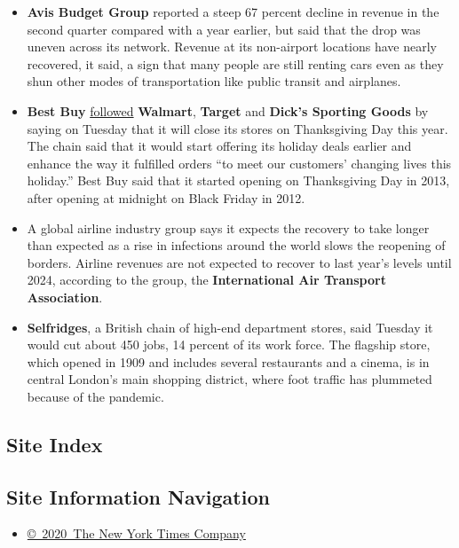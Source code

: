 \begin{itemize}
\item
  \textbf{Avis Budget Group} reported a steep 67 percent decline in
  revenue in the second quarter compared with a year earlier, but said
  that the drop was uneven across its network. Revenue at its
  non-airport locations have nearly recovered, it said, a sign that many
  people are still renting cars even as they shun other modes of
  transportation like public transit and airplanes.
\item
  \textbf{Best Buy}
  \href{https://www.nytimes.com/live/2020/07/27/business/stock-market-today-coronavirus/target-thanksgiving}{followed}
  \textbf{Walmart}, \textbf{Target} and \textbf{Dick's Sporting Goods}
  by saying on Tuesday that it will close its stores on Thanksgiving Day
  this year. The chain said that it would start offering its holiday
  deals earlier and enhance the way it fulfilled orders ``to meet our
  customers' changing lives this holiday.'' Best Buy said that it
  started opening on Thanksgiving Day in 2013, after opening at midnight
  on Black Friday in 2012.
\item
  A global airline industry group says it expects the recovery to take
  longer than expected as a rise in infections around the world slows
  the reopening of borders. Airline revenues are not expected to recover
  to last year's levels until 2024, according to the group, the
  \textbf{International Air Transport Association}.
\item
  \textbf{Selfridges}, a British chain of high-end department stores,
  said Tuesday it would cut about 450 jobs, 14 percent of its work
  force. The flagship store, which opened in 1909 and includes several
  restaurants and a cinema, is in central London's main shopping
  district, where foot traffic has plummeted because of the pandemic.
\end{itemize}

\hypertarget{site-index}{%
\subsection{Site Index}\label{site-index}}

\hypertarget{site-information-navigation}{%
\subsection{Site Information
Navigation}\label{site-information-navigation}}

\begin{itemize}
\tightlist
\item
  \href{https://help.nytimes.com/hc/en-us/articles/115014792127-Copyright-notice}{©~2020~The
  New York Times Company}
\end{itemize}

